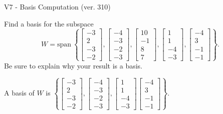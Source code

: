 \begin{exercise}
  \begin{exerciseTitle}V7 - Basis Computation (ver. 310)\end{exerciseTitle}
  \begin{exerciseStatement}
    Find a basis for the subspace 
\[W=\mathrm{span}\ \left\{\left[\begin{array}{r}
-3 \\
2 \\
-3 \\
-2
\end{array}\right] , \left[\begin{array}{r}
-4 \\
-3 \\
-2 \\
-3
\end{array}\right] , \left[\begin{array}{r}
10 \\
-1 \\
8 \\
7
\end{array}\right] , \left[\begin{array}{r}
1 \\
1 \\
-4 \\
-3
\end{array}\right] , \left[\begin{array}{r}
-4 \\
3 \\
-1 \\
-1
\end{array}\right]\right\}.\]
 Be sure to explain why your result is a basis.


  \end{exerciseStatement}
  \begin{exerciseAnswer}
   A basis of \(W\) is  \(\left\{\left[\begin{array}{r}
-3 \\
2 \\
-3 \\
-2
\end{array}\right] , \left[\begin{array}{r}
-4 \\
-3 \\
-2 \\
-3
\end{array}\right] , \left[\begin{array}{r}
1 \\
1 \\
-4 \\
-3
\end{array}\right] \left[\begin{array}{r}
-4 \\
3 \\
-1 \\
-1
\end{array}\right]\right\}\).
  


  \end{exerciseAnswer}
\end{exercise}